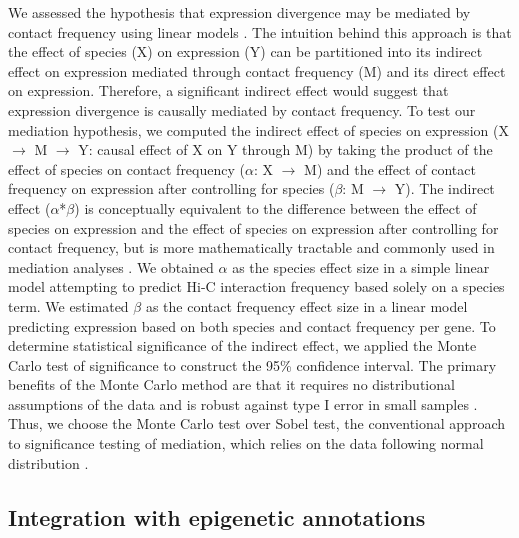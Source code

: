 We assessed the hypothesis that expression divergence may be mediated by contact frequency using linear models \cite{Baron.1986}. The intuition behind this approach is that the effect of species (X) on expression (Y) can be partitioned into its indirect effect on expression mediated through contact frequency (M) and its direct effect on expression. Therefore, a significant indirect effect would suggest that expression divergence is causally mediated by contact frequency. To test our mediation hypothesis, we computed the indirect effect of species on expression (X $\rightarrow$ M $\rightarrow$ Y: causal effect of X on Y through M) by taking the product of the effect of species on contact frequency ($\alpha$: X $\rightarrow$ M) and the effect of contact frequency on expression after controlling for species ($\beta$: M $\rightarrow$ Y). The indirect effect ($\alpha$*$\beta$) is conceptually equivalent to the difference between the effect of species on expression and the effect of species on expression after controlling for contact frequency, but is more mathematically tractable and commonly used in mediation analyses \cite{Sobel.1986, Sobel.1982, MacKinnon.2002}. We obtained $\alpha$ as the species effect size in a simple linear model attempting to predict Hi-C interaction frequency based solely on a species term. We estimated $\beta$ as the contact frequency effect size in a linear model predicting expression based on both species and contact frequency per gene. To determine statistical significance of the indirect effect, we applied the Monte Carlo test of significance to construct the 95\% confidence interval. The primary benefits of the Monte Carlo method are that it requires no distributional assumptions of the data and is robust against type I error in small samples \cite{MacKinnon.2004, Preacher.2012, Preacher.2004}. Thus, we choose the Monte Carlo test over Sobel test, the conventional approach to significance testing of mediation, which relies on the data following normal distribution \cite{Sobel.1986, Sobel.1982}.

\subsection{Integration with epigenetic annotations}

